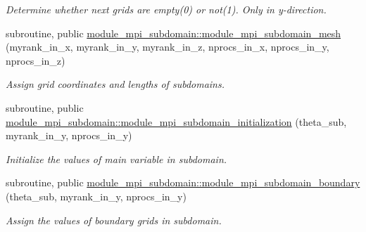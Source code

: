\begin{DoxyCompactItemize}
\begin{DoxyCompactList}\small\item\em Determine whether next grids are empty(0) or not(1). Only in y-\/direction. \end{DoxyCompactList}\item 
subroutine, public \mbox{\hyperlink{namespacemodule__mpi__subdomain_a73f1a66627a730c3906f200d9d31f974}{module\+\_\+mpi\+\_\+subdomain\+::module\+\_\+mpi\+\_\+subdomain\+\_\+mesh}} (myrank\+\_\+in\+\_\+x, myrank\+\_\+in\+\_\+y, myrank\+\_\+in\+\_\+z, nprocs\+\_\+in\+\_\+x, nprocs\+\_\+in\+\_\+y, nprocs\+\_\+in\+\_\+z)
\begin{DoxyCompactList}\small\item\em Assign grid coordinates and lengths of subdomains. \end{DoxyCompactList}\item 
subroutine, public \mbox{\hyperlink{namespacemodule__mpi__subdomain_a0be56ce2507138a1364de11e15f2bc7f}{module\+\_\+mpi\+\_\+subdomain\+::module\+\_\+mpi\+\_\+subdomain\+\_\+initialization}} (theta\+\_\+sub, myrank\+\_\+in\+\_\+y, nprocs\+\_\+in\+\_\+y)
\begin{DoxyCompactList}\small\item\em Initialize the values of main variable in subdomain. \end{DoxyCompactList}\item 
subroutine, public \mbox{\hyperlink{namespacemodule__mpi__subdomain_a3ebf20fcc8a3cd5d916adddf69af4833}{module\+\_\+mpi\+\_\+subdomain\+::module\+\_\+mpi\+\_\+subdomain\+\_\+boundary}} (theta\+\_\+sub, myrank\+\_\+in\+\_\+y, nprocs\+\_\+in\+\_\+y)
\begin{DoxyCompactList}\small\item\em Assign the values of boundary grids in subdomain. \end{DoxyCompactList}\end{DoxyCompactItemize}
